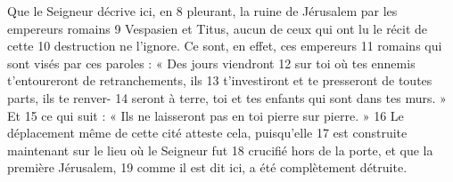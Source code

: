 Que le Seigneur décrive ici, en	 
8	 	pleurant, la ruine de Jérusalem par les empereurs romains	 
9	 	Vespasien et Titus, aucun de ceux qui ont lu le récit de cette	 
10	 	destruction ne l'ignore. Ce sont, en effet, ces empereurs	 
11	 	romains qui sont visés par ces paroles : « Des jours viendront	 
12	 	sur toi où tes ennemis t'entoureront de retranchements, ils	 
13	 	t'investiront et te presseront de toutes parts, ils te renver-	 
14	 	seront à terre, toi et tes enfants qui sont dans tes murs. » Et	 
15	 	ce qui suit : « Ils ne laisseront pas en toi pierre sur pierre. »	 
16	 	Le déplacement même de cette cité atteste cela, puisqu'elle	 
17	 	est construite maintenant sur le lieu où le Seigneur fut	 
18	 	crucifié hors de la porte, et que la première Jérusalem,	 
19	 	comme il est dit ici, a été complètement détruite.